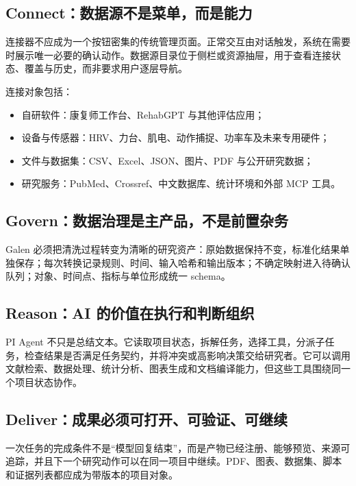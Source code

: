 \documentclass[11pt,a4paper,UTF8]{ctexart}
\begin{document}
\subsection{Connect：数据源不是菜单，而是能力}

连接器不应成为一个按钮密集的传统管理页面。正常交互由对话触发，系统在需要时展示唯一必要的确认动作。数据源目录位于侧栏或资源抽屉，用于查看连接状态、覆盖与历史，而非要求用户逐层导航。

连接对象包括：

\begin{itemize}
  \item 自研软件：康复师工作台、RehabGPT 与其他评估应用；
  \item 设备与传感器：HRV、力台、肌电、动作捕捉、功率车及未来专用硬件；
  \item 文件与数据集：CSV、Excel、JSON、图片、PDF 与公开研究数据；
  \item 研究服务：PubMed、Crossref、中文数据库、统计环境和外部 MCP 工具。
\end{itemize}

\subsection{Govern：数据治理是主产品，不是前置杂务}

Galen 必须把清洗过程转变为清晰的研究资产：原始数据保持不变，标准化结果单独保存；每次转换记录规则、时间、输入哈希和输出版本；不确定映射进入待确认队列；对象、时间点、指标与单位形成统一 schema。

\subsection{Reason：AI 的价值在执行和判断组织}

PI Agent 不只是总结文本。它读取项目状态，拆解任务，选择工具，分派子任务，检查结果是否满足任务契约，并将冲突或高影响决策交给研究者。它可以调用文献检索、数据处理、统计分析、图表生成和文档编译能力，但这些工具围绕同一个项目状态协作。

\subsection{Deliver：成果必须可打开、可验证、可继续}

一次任务的完成条件不是“模型回复结束”，而是产物已经注册、能够预览、来源可追踪，并且下一个研究动作可以在同一项目中继续。PDF、图表、数据集、脚本和证据列表都应成为带版本的项目对象。

\end{document}
